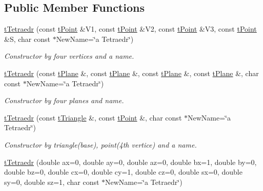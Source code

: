 \subsection*{Public Member Functions}
\begin{DoxyCompactItemize}
\item 
\mbox{\label{classtTetraedr_ae16c310b01dbd8381503cf3610a9953e}} 
\hyperlink{classtTetraedr_ae16c310b01dbd8381503cf3610a9953e}{t\+Tetraedr} (const \hyperlink{classtPoint}{t\+Point} \&V1, const \hyperlink{classtPoint}{t\+Point} \&V2, const \hyperlink{classtPoint}{t\+Point} \&V3, const \hyperlink{classtPoint}{t\+Point} \&S, char const $\ast$New\+Name=\char`\"{}a Tetraedr\char`\"{})
\begin{DoxyCompactList}\small\item\em Constructor by four vertices and a name. \end{DoxyCompactList}\item 
\mbox{\label{classtTetraedr_ad276c51eebadada75b0e1a014421e426}} 
\hyperlink{classtTetraedr_ad276c51eebadada75b0e1a014421e426}{t\+Tetraedr} (const \hyperlink{classtPlane}{t\+Plane} \&, const \hyperlink{classtPlane}{t\+Plane} \&, const \hyperlink{classtPlane}{t\+Plane} \&, const \hyperlink{classtPlane}{t\+Plane} \&, char const $\ast$New\+Name=\char`\"{}a Tetraedr\char`\"{})
\begin{DoxyCompactList}\small\item\em Constructor by four planes and name. \end{DoxyCompactList}\item 
\mbox{\label{classtTetraedr_aef32a93d0050137e7bd1fff3688a830b}} 
\hyperlink{classtTetraedr_aef32a93d0050137e7bd1fff3688a830b}{t\+Tetraedr} (const \hyperlink{classtTriangle}{t\+Triangle} \&, const \hyperlink{classtPoint}{t\+Point} \&, char const $\ast$New\+Name=\char`\"{}a Tetraedr\char`\"{})
\begin{DoxyCompactList}\small\item\em Constructor by triangle(base), point(4th vertice) and a name. \end{DoxyCompactList}\item 
\mbox{\label{classtTetraedr_a244165229504fe41e8ee386b6fdafc39}} 
\hyperlink{classtTetraedr_a244165229504fe41e8ee386b6fdafc39}{t\+Tetraedr} (double ax=0, double ay=0, double az=0, double bx=1, double by=0, double bz=0, double cx=0, double cy=1, double cz=0, double sx=0, double sy=0, double sz=1, char const $\ast$New\+Name=\char`\"{}a Tetraedr\char`\"{})

\end{DoxyCompactItemize}
